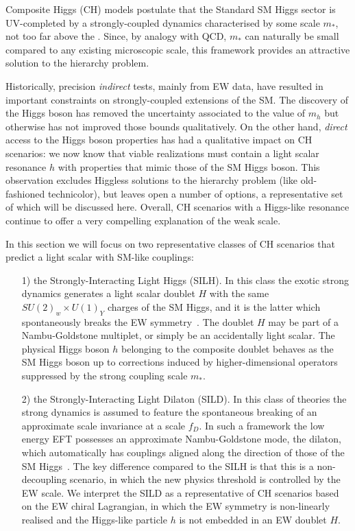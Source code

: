 

Composite Higgs (CH) models postulate that the Standard SM Higgs sector is UV-completed by a strongly-coupled dynamics characterised by some scale $m_*$, not too far above the \UTeV. Since, by analogy with QCD, $m_*$ can naturally be small compared to any existing microscopic scale, this framework provides an attractive solution to the hierarchy problem. 

Historically, precision {\emph{indirect}} tests, mainly from EW data, have resulted in important constraints on strongly-coupled extensions of the SM. The discovery of the Higgs boson has removed the uncertainty associated to the value of $m_h$ but otherwise has not improved those bounds qualitatively. On the other hand, {\emph{direct}} access to the Higgs boson properties has had a qualitative impact on CH scenarios: we now know that viable realizations must contain a light scalar resonance $h$ with properties that mimic those of the SM Higgs boson. This observation excludes Higgless solutions to the hierarchy problem (like old-fashioned technicolor), but leaves open a number of options, a representative set of which will be discussed here. Overall, CH scenarios with a Higgs-like resonance continue to offer a very compelling explanation of the weak scale.




In this section we will focus on two representative classes of CH scenarios that predict a light scalar with SM-like couplings:
\begin{itemize}
\item[1)] the Strongly-Interacting Light Higgs (SILH). In this class the exotic strong dynamics generates a light scalar doublet $H$ with the same $SU(2)_w\times U(1)_Y$ charges of the SM Higgs, and it is the latter which spontaneously breaks the EW symmetry~\cite{Kaplan:1983fs, Kaplan:1983sm}. The doublet $H$ may be part of a Nambu-Goldstone multiplet, or simply be an accidentally light scalar. The physical Higgs boson $h$ belonging to the composite doublet behaves as the SM Higgs boson up to corrections induced by higher-dimensional operators suppressed by the strong coupling scale $m_*$. 
\item[2)] the Strongly-Interacting Light Dilaton (SILD). In this class of theories the strong dynamics is assumed to feature the spontaneous breaking of an approximate scale invariance at a scale $f_D$. In such a framework the low energy EFT possesses an approximate Nambu-Goldstone mode, the dilaton, which automatically has couplings aligned along the direction of those of the SM Higgs~\cite{Goldberger:2008zz}. The key difference compared to the SILH is that this is a non-decoupling scenario, in which the new physics threshold is controlled by the EW scale. We interpret the SILD as a representative of CH scenarios based on the EW chiral Lagrangian, in which the EW symmetry is non-linearly realised and the Higgs-like particle $h$ is not embedded in an EW doublet $H$. 
\end{itemize}



